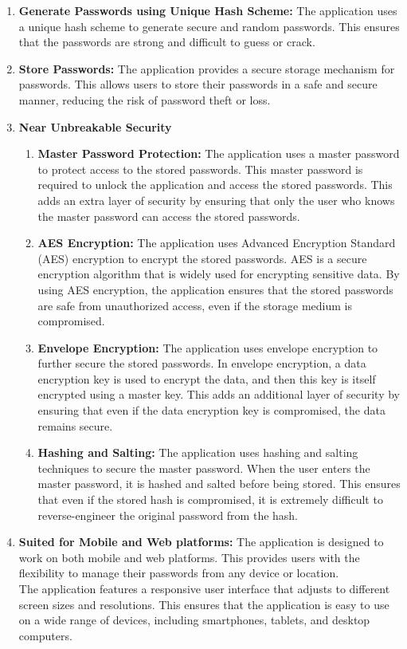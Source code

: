 \documentclass[11pt]{article}
\begin{document}
\begin{enumerate}
    \item \textbf{Generate Passwords using Unique Hash Scheme:} The application uses a unique hash scheme to generate secure and random passwords. This ensures that the passwords are strong and difficult to guess or crack.

    \item \textbf{Store Passwords:} The application provides a secure storage mechanism for passwords. This allows users to store their passwords in a safe and secure manner, reducing the risk of password theft or loss.

    \item \textbf{Near Unbreakable Security}
          \begin{enumerate}
              \item \textbf{Master Password Protection:} The application uses a master password to protect access to the stored passwords. This master password is required to unlock the application and access the stored passwords. This adds an extra layer of security by ensuring that only the user who knows the master password can access the stored passwords.

              \item \textbf{AES Encryption:} The application uses Advanced Encryption Standard (AES) encryption to encrypt the stored passwords. AES is a secure encryption algorithm that is widely used for encrypting sensitive data. By using AES encryption, the application ensures that the stored passwords are safe from unauthorized access, even if the storage medium is compromised.

              \item \textbf{Envelope Encryption:} The application uses envelope encryption to further secure the stored passwords. In envelope encryption, a data encryption key is used to encrypt the data, and then this key is itself encrypted using a master key. This adds an additional layer of security by ensuring that even if the data encryption key is compromised, the data remains secure.

              \item \textbf{Hashing and Salting:} The application uses hashing and salting techniques to secure the master password. When the user enters the master password, it is hashed and salted before being stored. This ensures that even if the stored hash is compromised, it is extremely difficult to reverse-engineer the original password from the hash.
          \end{enumerate}

    \item \textbf{Suited for Mobile and Web platforms:} The application is designed to work on both mobile and web platforms. This provides users with the flexibility to manage their passwords from any device or location.\\
          The application features a responsive user interface that adjusts to different screen sizes and resolutions. This ensures that the application is easy to use on a wide range of devices, including smartphones, tablets, and desktop computers.
\end{enumerate}
\end{document}
